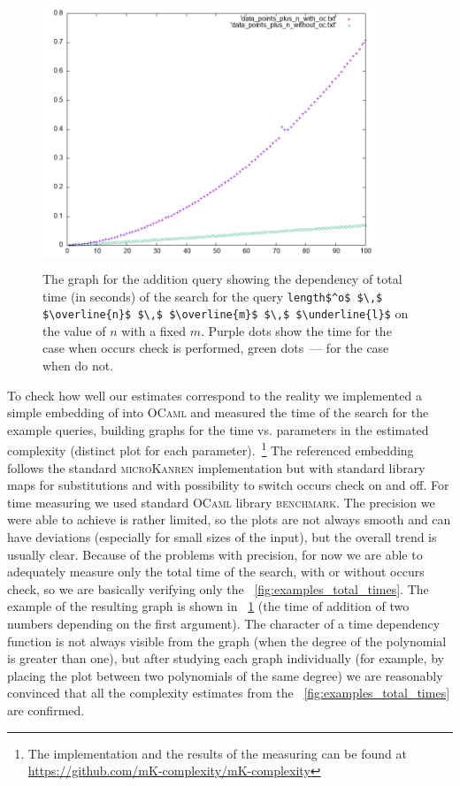 \begin{figure}[t]
    \includegraphics[width=10cm,height=8cm]{plot_example}
  \caption{The graph for the addition query showing the dependency of total time (in seconds) of the search for the query \lstinline|length$^o$ $\,$ $\overline{n}$ $\,$ $\overline{m}$ $\,$ $\underline{l}$| on the value of $n$ with a fixed $m$. Purple dots show the time for the case when occurs check is performed, green dots~--- for the case when do not. }
  \label{fig:plot_example}
\end{figure}

To check how well our estimates correspond to the reality we implemented a simple embedding of \mK into \textsc{OCaml} and measured the time of the search for the example queries,
building graphs for the time vs. parameters in the estimated complexity (distinct plot for each parameter).~\footnote{The implementation and the results of the measuring can be found at \url{https://github.com/mK-complexity/mK-complexity}} The referenced embedding follows the standard \textsc{microKanren} implementation but with standard library maps for substitutions and with possibility to switch occurs check on and off.
For time measuring we used standard \textsc{OCaml} library \textsc{benchmark}. The precision we were able to achieve is rather limited, so the plots are not always smooth and can have
deviations (especially for small sizes of the input), but the overall trend is usually clear. Because of the problems with precision, for now we are able to adequately measure only the total
time of the search, with or without occurs check, so we are basically verifying only the \figureword~\ref{fig:examples_total_times}. 
The example of the resulting graph is shown in \figureword~\ref{fig:plot_example} (the time of addition of two numbers depending on the first argument). The character of a time dependency function
is not always visible from the graph (when the degree of the polynomial is greater than one), but after studying each graph individually (for example, by placing the plot between two polynomials of the same degree) we are reasonably convinced that all the complexity estimates from the \figureword~\ref{fig:examples_total_times} are confirmed.
